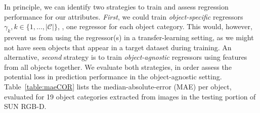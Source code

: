 \documentclass[10pt,twocolumn,letterpaper]{article}
\begin{document}
In principle, we can identify two strategies to train and assess
regression performance for our attributes. \emph{First}, we could 
train \emph{object-specific} regressors 
$\gamma_k, k \in \{1,\ldots, |\mathcal{C}|\}$, \ie, one regressor
for each object category. This would, however, prevent us from 
using the regressor(s) in a transfer-learning setting, as we might not
have seen objects that appear in a target dataset during training. 
An alternative, \emph{second} 
strategy is to train \emph{object-agnostic} regressors 
using features from all objects together. We evaluate both 
strategies, in order assess the potential loss in prediction
performance in the object-agnostic setting. 
Table~\ref{table:maeCOR} lists
the median-absolute-error (MAE) per object, evaluated for 
19 object categories extracted from images in 
the testing portion of SUN RGB-D. 
\end{document}
